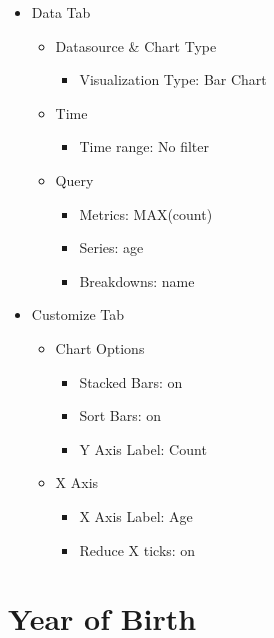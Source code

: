 \documentclass[
]{book}
\providecommand{\tightlist}{%
  \setlength{\itemsep}{0pt}\setlength{\parskip}{0pt}}
\begin{document}
\begin{itemize}
\item
  Data Tab

  \begin{itemize}
  \item
    Datasource \& Chart Type

    \begin{itemize}
    \tightlist
    \item
      Visualization Type: Bar Chart
    \end{itemize}
  \item
    Time

    \begin{itemize}
    \tightlist
    \item
      Time range: No filter
    \end{itemize}
  \item
    Query

    \begin{itemize}
    \item
      Metrics: MAX(count)
    \item
      Series: age
    \item
      Breakdowns: name
    \end{itemize}
  \end{itemize}
\item
  Customize Tab

  \begin{itemize}
  \item
    Chart Options

    \begin{itemize}
    \item
      Stacked Bars: on
    \item
      Sort Bars: on
    \item
      Y Axis Label: Count
    \end{itemize}
  \item
    X Axis

    \begin{itemize}
    \item
      X Axis Label: Age
    \item
      Reduce X ticks: on
    \end{itemize}
  \end{itemize}
\end{itemize}

\hypertarget{year-of-birth}{%
\section{Year of Birth}\label{year-of-birth}}
\end{document}
